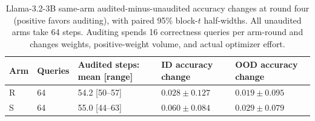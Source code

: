 \begin{table}[H]
\caption{Llama-3.2-3B same-arm audited-minus-unaudited accuracy changes at round four (positive favors auditing), with paired 95\% block-$t$ half-widths. All unaudited arms take 64 steps. Auditing spends 16 correctness queries per arm-round and changes weights, positive-weight volume, and actual optimizer effort.}
\label{tab:llama-audit-change}
\centering\small\setlength{\tabcolsep}{3pt}
\begin{tabular}{@{}lllll@{}}
\toprule
Arm & Queries & Audited steps: mean [range] & ID accuracy change & OOD accuracy change\\
\midrule
R & 64 & 54.2 [50--57] & $0.028\pm0.127$ & $0.019\pm0.095$\\
S & 64 & 55.0 [44--63] & $0.060\pm0.084$ & $0.029\pm0.079$\\
\bottomrule
\end{tabular}
\end{table}
